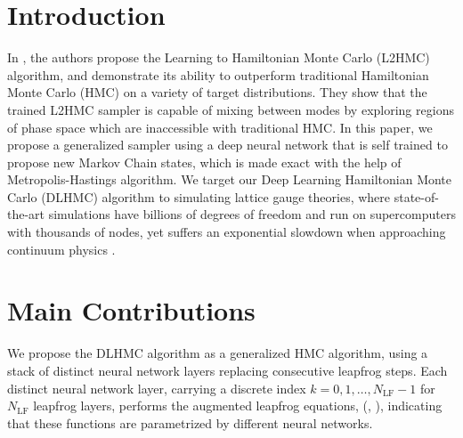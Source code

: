 \documentclass{article} %
\begin{document}
\section{\label{sec:introduction}Introduction}
In \citet{levy2017}, the authors propose the Learning to Hamiltonian Monte Carlo (L2HMC) algorithm, and demonstrate
its ability to outperform traditional Hamiltonian Monte Carlo (HMC) on a variety of %
target
distributions.
%
They show that the trained L2HMC sampler is capable of mixing between modes by exploring regions of phase space which are %
inaccessible with traditional HMC.
%
In this paper, we propose a generalized sampler using a deep neural network that is self trained to propose new Markov Chain states,
which is made exact with the help of Metropolis-Hastings \citep{zbMATH03349185} algorithm.
We target our Deep Learning Hamiltonian Monte Carlo (DLHMC) algorithm to simulating lattice gauge theories,
where state-of-the-art simulations have billions of degrees of freedom and run on supercomputers with thousands of nodes,
yet suffers an exponential slowdown when approaching continuum physics \citep{schaefer2009investigating,cossu2018testing}.

\section{\label{sec:main_contributions}Main Contributions}
We propose the DLHMC algorithm as a generalized HMC algorithm,
      using a stack of distinct neural network layers replacing consecutive leapfrog steps.
      Each distinct neural network layer, carrying a discrete index \(k = 0, 1, \ldots, N_{\mathrm{LF}}-1\) for $N_{\mathrm{LF}}$
      leapfrog layers, performs the
      augmented leapfrog equations, (, ), indicating that
      these functions are parametrized by different neural networks.
      
\end{document}
